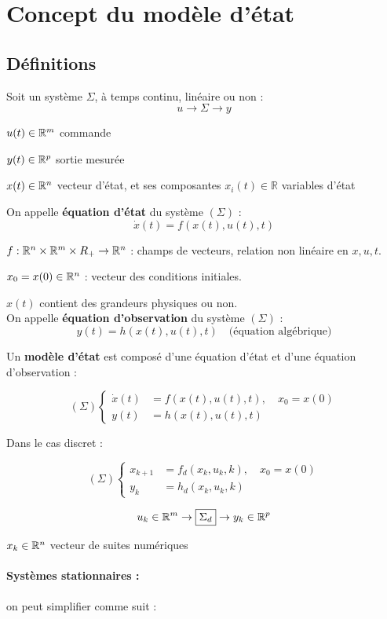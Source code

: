 \documentclass[main.tex]{subfiles}
\begin{document}
\section{Concept du modèle d'état}

\subsection{Définitions}
Soit un système $\Sigma$, à temps continu, linéaire ou non :
\[ u \rightarrow \boxed{\Sigma} \rightarrow y\]

$u(t) \in \mathbb{R}^m$ commande

$y(t)\in \mathbb{R}^p $ sortie mesurée

$x(t) \in \mathbb{R}^n$ vecteur d'état, et ses composantes $x_i(t)\in \mathbb{R}$ variables d'état\\
\begin{defin}
On appelle \textbf{équation d'état} du système $(\Sigma)$ :
\[ \dot{x}(t) = f(x(t),u(t),t) \]

$f : \mathbb{R}^n \times \mathbb{R}^m \times R_+ \rightarrow \mathbb{R}^n$ : champs de vecteurs, relation non linéaire en $x,u,t$.

$x_0=x(0) \in \mathbb{R}^n$ : vecteur des conditions initiales.

$x(t)$ contient des grandeurs physiques ou non.\\

On appelle \textbf{équation d'observation }du système $(\Sigma)$ :
\[ y(t) = h(x(t),u(t),t) \quad \text{(équation algébrique)} \]

Un \textbf{modèle d'état} est composé d'une équation d'état et d'une équation d'observation :

\[
(\Sigma)
\left\{
\begin{array}{ll}
\dot{x}(t) & = f(x(t),u(t),t), \quad x_0=x(0) \\
y(t) & = h(x(t),u(t),t)
\end{array}
\right.
\]

Dans le cas discret :

\[
(\Sigma)
\left\{
\begin{array}{ll}
x_{k+1} & = f_d(x_k,u_k,k), \quad x_0=x(0) \\
y_k & = h_d(x_k,u_k,k)
\end{array}
\right.
\]

\[ u_k\in \mathbb{R}^m \rightarrow \boxed{\Sigma_d} \rightarrow y_k\in\mathbb{R}^p \]

$x_k \in \mathbb{R}^n$ vecteur de suites numériques
\end{defin}
\paragraph{Systèmes stationnaires :} on peut simplifier comme suit :
\end{document}
